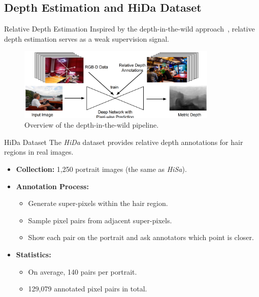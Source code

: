 \subsection{Depth Estimation and HiDa Dataset}

\begin{frame}{Relative Depth Estimation}
    Inspired by the depth-in-the-wild approach~\cite{Zhou2018SingleViewHR}, relative depth estimation serves as a weak supervision signal.
    \begin{figure}[t]
        \centering
        \includegraphics[width=0.85\textwidth]{assets/figures/method/depth/depth-in-the-wild.png}
        \caption{Overview of the depth-in-the-wild pipeline.}
        \label{fig:depth_in_the_wild}
    \end{figure}
\end{frame}

\begin{frame}[t]{HiDa Dataset}
    The \emph{HiDa} dataset provides relative depth annotations for hair regions in real images.

    \begin{itemize}
        \item \textbf{Collection:} 1,250 portrait images (the same as \textit{HiSa}).
        \item \textbf{Annotation Process:}
        \begin{itemize}
            \item Generate super-pixels within the hair region.
            \item Sample pixel pairs from adjacent super-pixels.
            \item Show each pair on the portrait and ask annotators which point is closer.
        \end{itemize}
        \item \textbf{Statistics:}
        \begin{itemize}
            \item On average, 140 pairs per portrait.
            \item 129,079 annotated pixel pairs in total.
        \end{itemize}
    \end{itemize}
\end{frame}



